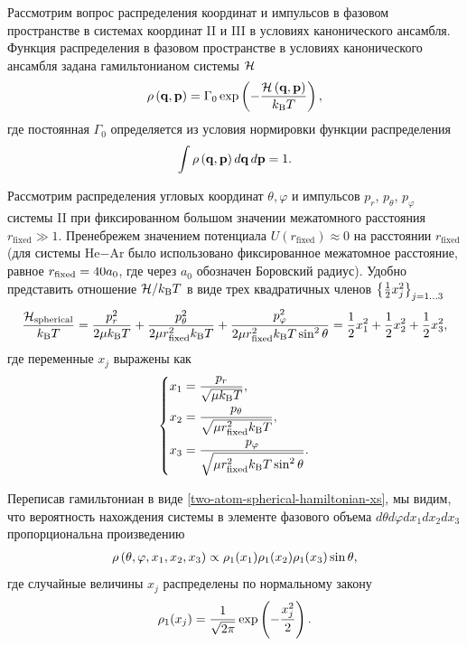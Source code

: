 Рассмотрим вопрос распределения координат и импульсов в фазовом пространстве в системах координат II и III в условиях канонического ансамбля. Функция распределения в фазовом пространстве в условиях канонического ансамбля задана гамильтонианом системы $\mathcal{H}$ \cite{hill} 
\begin{gather}
    \rho \left( \mathbf{q}, \mathbf{p} \right) = \Gamma_0 \exp \left( -\frac{\mathcal{H} \left( \mathbf{q}, \mathbf{p} \right)}{k_\text{B} T} \right),
\end{gather}
% 
где постоянная $\Gamma_0$ определяется из условия нормировки функции распределения
\begin{gather}
    \int \rho \left( \mathbf{q}, \mathbf{p} \right) d \mathbf{q} \, d\mathbf{p} = 1.
\end{gather}

Рассмотрим распределения угловых координат $\theta, \varphi$ и импульсов $p_r$, $p_\theta$, $p_\varphi$ системы II при фиксированном большом значении межатомного расстояния $r_\text{fixed} \gg 1$. Пренебрежем значением потенциала $U(r_\text{fixed}) \approx 0$ на расстоянии $r_\text{fixed}$ (для системы He$-$Ar было использовано фиксированное межатомное расстояние, равное $r_\text{fixed} = 40 a_0$, где через $a_0$ обозначен Боровский радиус). Удобно представить отношение $\mathcal{H} / k_\text{B} T$ в виде трех квадратичных членов $\left\{ \frac{1}{2} x_j^2 \right\}_{j = 1 \dots 3}$
\begin{gather}
    \frac{\mathcal{H}_\text{spherical}}{k_\text{B} T} = \frac{p_r^2}{2 \mu k_\text{B} T} + \frac{p_\theta^2}{2 \mu r_\text{fixed}^2 k_\text{B} T} + \frac{p_\varphi^2}{2 \mu r_\text{fixed}^2 k_\text{B} T \sin^2 \theta} = \frac{1}{2} x_1^2 + \frac{1}{2} x_2^2 + \frac{1}{2} x_3^2, \label{two-atom-spherical-hamiltonian-xs} 
\end{gather}
%
где переменные $x_j$ выражены как
\begin{gather}
    \left\{
    \begin{aligned}
        x_1 &= \frac{p_r}{\sqrt{\mu k_\text{B} T}}, \\
        x_2 &= \frac{p_\theta}{\sqrt{\mu r_\text{fixed}^2 k_\text{B} T}}, \\
        x_3 &= \frac{p_\varphi}{\sqrt{\mu r_\text{fixed}^2 k_\text{B} T \sin^2 \theta}}.
    \end{aligned}
\right. \label{two-atom-xs}
\end{gather}

Переписав гамильтониан в виде \eqref{two-atom-spherical-hamiltonian-xs}, мы видим, что вероятность нахождения системы в элементе фазового объема $d\theta d\varphi dx_1 dx_2 dx_3$ пропорциональна произведению 
\begin{gather}
    \rho \left( \theta, \varphi, x_1, x_2, x_3 \right) \propto \rho_1(x_1) \rho_1(x_2) \rho_1(x_3) \sin \theta, \label{two-atom-xs-phase-element}
\end{gather}
%
где случайные величины $x_j$ распределены по нормальному закону
\begin{gather}
    \rho_1 (x_j) = \frac{1}{\sqrt{2 \pi}} \exp \left( -\frac{x_j^2}{2} \right). 
\end{gather}

